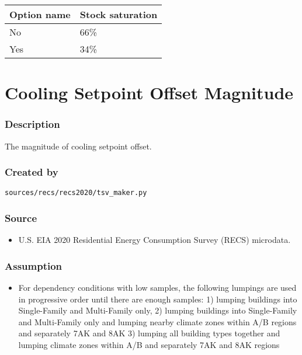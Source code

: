 \begin{longtable}[]{@{}ll@{}}
\toprule\noalign{}
Option name & Stock saturation \\
\midrule\noalign{}
\endhead
\bottomrule\noalign{}
\endlastfoot
No & 66\% \\
Yes & 34\% \\
\end{longtable}

\section{Cooling Setpoint Offset
Magnitude}\label{cooling_setpoint_offset_magnitude}

\subsubsection{Description}\label{description-24}

The magnitude of cooling setpoint offset.

\subsubsection{Created by}\label{created-by-24}

\texttt{sources/recs/recs2020/tsv\_maker.py}

\subsubsection{Source}\label{source-24}

\begin{itemize}
 
\item
  U.S. EIA 2020 Residential Energy Consumption Survey (RECS) microdata.
\end{itemize}

\subsubsection{Assumption}\label{assumption-15}

\begin{itemize}
 
\item
  For dependency conditions with low samples, the following lumpings are
  used in progressive order until there are enough samples: 1) lumping
  buildings into Single-Family and Multi-Family only, 2) lumping
  buildings into Single-Family and Multi-Family only and lumping nearby
  climate zones within A/B regions and separately 7AK and 8AK 3) lumping
  all building types together and lumping climate zones within A/B and
  separately 7AK and 8AK regions
\end{itemize}

